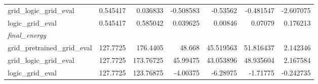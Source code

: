 \begin{tabular}{lrrrrrr}
  grid_logic_grid_eval & 0.545417 & 0.036833 & -0.508583 & -0.53562 & -0.481547 & -2.607075 \\
  logic_grid_eval & 0.545417 & 0.585042 & 0.039625 & 0.00846 & 0.07079 & 0.176213 \\
  \multicolumn{7}{l}{\textit{final_energy}} \\
  grid_pretrained_grid_eval & 127.7725 & 176.4405 & 48.668 & 45.519563 & 51.816437 & 2.142346 \\
  grid_logic_grid_eval & 127.7725 & 173.76725 & 45.99475 & 43.053896 & 48.935604 & 2.167584 \\
  logic_grid_eval & 127.7725 & 123.76875 & -4.00375 & -6.28975 & -1.71775 & -0.242735 \\
\bottomrule
\end{tabular}